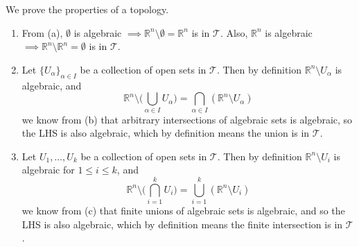  \begin{solution}[d] 
    We prove the properties of a topology. 
    \begin{enumerate}
      \item From (a), $\emptyset$ is algebraic $\implies \mathbb{R}^n \setminus \emptyset = \mathbb{R}^n$ is in $\mathscr{T}$. Also, $\mathbb{R}^n$ is algebraic $\implies \mathbb{R}^n \setminus \mathbb{R}^n = \emptyset$ is in $\mathscr{T}$.  

      \item Let $\{U_\alpha\}_{\alpha \in I}$ be a collection of open sets in $\mathscr{T}$. Then by definition $\mathbb{R}^n \setminus U_\alpha$ is algebraic, and 
      \begin{equation}
        \mathbb{R}^n \setminus \bigg( \bigcup_{\alpha \in I} U_\alpha \bigg) = \bigcap_{\alpha \in I} (\mathbb{R}^n \setminus U_\alpha) 
      \end{equation} 
      we know from (b) that arbitrary intersections of algebraic sets is algebraic, so the LHS is also algebraic, which by definition means the union is in $\mathscr{T}$. 

      \item Let $U_1, \ldots, U_k$ be a collection of open sets in $\mathscr{T}$. Then by definition $\mathbb{R}^n \setminus U_i$ is algebraic for $1 \leq i \leq k$, and  
      \begin{equation}
        \mathbb{R}^n \setminus \bigg( \bigcap_{i=1}^k U_i \bigg) = \bigcup_{i=1}^k (\mathbb{R}^n \setminus U_i)
      \end{equation}
      we know from (c) that finite unions of algebraic sets is algebraic, and so the LHS is also algebraic, which by definition means the finite intersection is in $\mathscr{T}$. 
    \end{enumerate}
  \end{solution}
